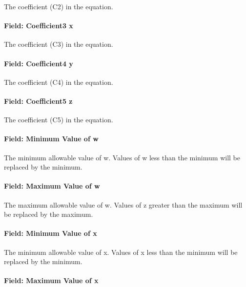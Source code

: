 The coefficient (C2) in the equation.

\paragraph{Field: Coefficient3 x}\label{field-coefficient3-x}

The coefficient (C3) in the equation.

\paragraph{Field: Coefficient4 y}\label{field-coefficient4-y}

The coefficient (C4) in the equation.

\paragraph{Field: Coefficient5 z}\label{field-coefficient5-z}

The coefficient (C5) in the equation.

\paragraph{Field: Minimum Value of w}\label{field-minimum-value-of-w}

The minimum allowable value of w. Values of w less than the minimum will be replaced by the minimum.

\paragraph{Field: Maximum Value of w}\label{field-maximum-value-of-w}

The maximum allowable value of w. Values of z greater than the maximum will be replaced by the maximum.

\paragraph{Field: Minimum Value of x}\label{field-minimum-value-of-x-1}

The minimum allowable value of x. Values of x less than the minimum will be replaced by the minimum.

\paragraph{Field: Maximum Value of x}\label{field-maximum-value-of-x-1}

